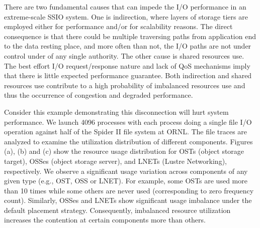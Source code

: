 There are two fundamental causes that can impede the I/O performance in an
extreme-scale SSIO system. One is indirection, where layers of storage tiers
are employed either for performance and/or for scalability reasons.  The direct
consequence is that there could be multiple traversing paths from application
end to the data resting place, and more often than not, the I/O paths are not
under control under of any single authority. The other cause is shared
resources use. The best effort I/O request/response nature and lack of QoS
mechanisms imply that there is little expected performance guarantee.  Both
indirection and shared resources use contribute to a high probability of
imbalanced resources use and thus the occurrence of congestion and degraded
performance.

Consider this example demonstrating this disconnection will hurt system
performance. We launch 4096 processes with each process doing a single file I/O
operation against half of the Spider II file system at ORNL. The file traces
are analyzed to examine the utilization distribution of different components.
Figures (a), (b) and (c) show the resource usage distribution for OSTs (object storage
target), OSSes (object storage server),
and LNETs (Lustre Networking), respectively. We observe a significant usage variation
across components of any given type (e.g., OST, OSS or LNET). For example, some
OSTs are used more than 10 times while some others are never used
(corresponding to zero frequency count). Similarly, OSSes and LNETs show
significant usage imbalance under the default placement strategy.
Consequently, imbalanced resource utilization increases the contention at
certain components more than others.



